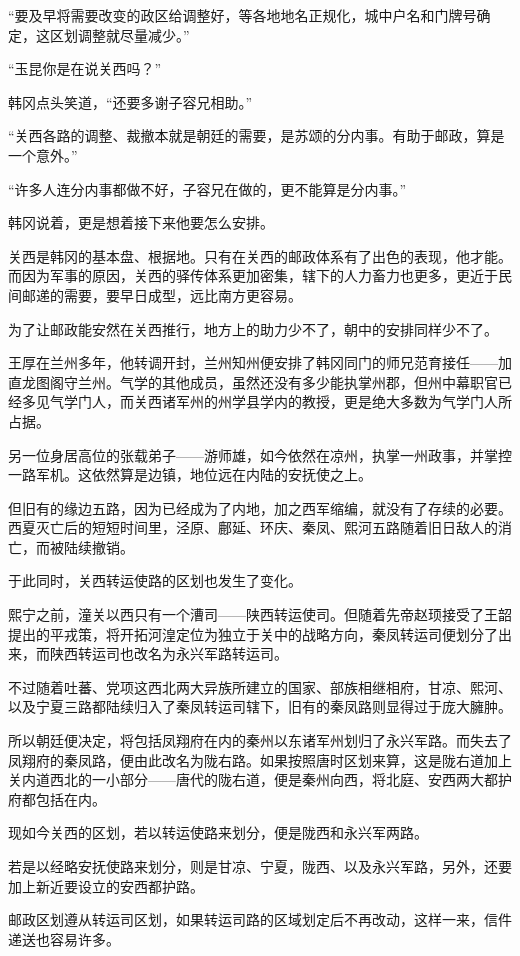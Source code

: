 “要及早将需要改变的政区给调整好，等各地地名正规化，城中户名和门牌号确定，这区划调整就尽量减少。”

“玉昆你是在说关西吗？”

韩冈点头笑道，“还要多谢子容兄相助。”

“关西各路的调整、裁撤本就是朝廷的需要，是苏颂的分内事。有助于邮政，算是一个意外。”

“许多人连分内事都做不好，子容兄在做的，更不能算是分内事。”

韩冈说着，更是想着接下来他要怎么安排。

关西是韩冈的基本盘、根据地。只有在关西的邮政体系有了出色的表现，他才能。而因为军事的原因，关西的驿传体系更加密集，辖下的人力畜力也更多，更近于民间邮递的需要，要早日成型，远比南方更容易。

为了让邮政能安然在关西推行，地方上的助力少不了，朝中的安排同样少不了。

王厚在兰州多年，他转调开封，兰州知州便安排了韩冈同门的师兄范育接任——加直龙图阁守兰州。气学的其他成员，虽然还没有多少能执掌州郡，但州中幕职官已经多见气学门人，而关西诸军州的州学县学内的教授，更是绝大多数为气学门人所占据。

另一位身居高位的张载弟子——游师雄，如今依然在凉州，执掌一州政事，并掌控一路军机。这依然算是边镇，地位远在内陆的安抚使之上。

但旧有的缘边五路，因为已经成为了内地，加之西军缩编，就没有了存续的必要。西夏灭亡后的短短时间里，泾原、鄜延、环庆、秦凤、熙河五路随着旧日敌人的消亡，而被陆续撤销。

于此同时，关西转运使路的区划也发生了变化。

熙宁之前，潼关以西只有一个漕司——陕西转运使司。但随着先帝赵顼接受了王韶提出的平戎策，将开拓河湟定位为独立于关中的战略方向，秦凤转运司便划分了出来，而陕西转运司也改名为永兴军路转运司。

不过随着吐蕃、党项这西北两大异族所建立的国家、部族相继相府，甘凉、熙河、以及宁夏三路都陆续归入了秦凤转运司辖下，旧有的秦凤路则显得过于庞大臃肿。

所以朝廷便决定，将包括凤翔府在内的秦州以东诸军州划归了永兴军路。而失去了凤翔府的秦凤路，便由此改名为陇右路。如果按照唐时区划来算，这是陇右道加上关内道西北的一小部分——唐代的陇右道，便是秦州向西，将北庭、安西两大都护府都包括在内。

现如今关西的区划，若以转运使路来划分，便是陇西和永兴军两路。

若是以经略安抚使路来划分，则是甘凉、宁夏，陇西、以及永兴军路，另外，还要加上新近要设立的安西都护路。

邮政区划遵从转运司区划，如果转运司路的区域划定后不再改动，这样一来，信件递送也容易许多。

